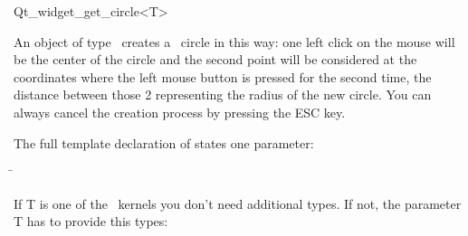 
\begin{ccRefClass}{Qt_widget_get_circle<T>}

\ccDefinition
An object of type \ccRefName\ creates a \cgal\ circle in this way: one 
left click on the mouse will be the center of the circle and the
second point will be considered at the coordinates where the left
mouse button is pressed for the second time, the distance
between those 2 representing the radius of the new circle.
You can always cancel the creation process by pressing the ESC key.


\ccParameters

The full template declaration of  states one parameter:

\begin{tabbing}
 \=\\
\end{tabbing}

If T is one of the \cgal\ kernels you don't need additional types. If
not, the parameter T has to provide this types:

\ccTypes
{}

\ccInheritsFrom
{}

\ccGlue

\ccCreation
{}


\end{ccRefClass}









